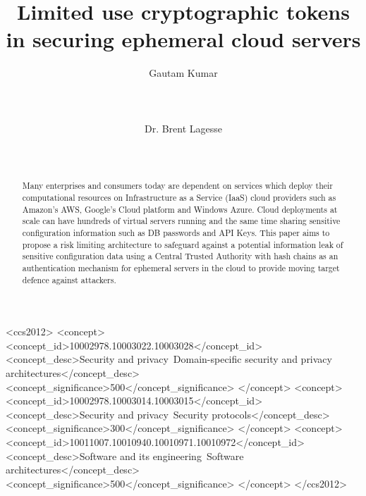 \documentclass{sig-alternate-05-2015}
\begin{document}
\title{Limited use cryptographic tokens in securing ephemeral cloud servers}

\author{
%
%
\alignauthor
Gautam Kumar\\
       \\
       \\
       \\
\alignauthor
Dr. Brent Lagesse\\
       \\
       \\
}



\maketitle


\begin{abstract}


Many enterprises and consumers today are dependent on services which deploy their computational resources on Infrastructure as a Service (IaaS) cloud providers such as Amazon's AWS, Google's Cloud platform and Windows Azure. Cloud deployments at scale can have hundreds of virtual servers running and the same time sharing sensitive configuration information such as DB passwords and API Keys. This paper aims to propose a risk limiting architecture to safeguard against a potential information leak of sensitive configuration data using a Central Trusted Authority with hash chains as an authentication mechanism for ephemeral servers in the cloud to provide moving target defence against attackers.
\end{abstract}


\begin{CCSXML}
<ccs2012>
<concept>
<concept_id>10002978.10003022.10003028</concept_id>
<concept_desc>Security and privacy~Domain-specific security and privacy architectures</concept_desc>
<concept_significance>500</concept_significance>
</concept>
<concept>
<concept_id>10002978.10003014.10003015</concept_id>
<concept_desc>Security and privacy~Security protocols</concept_desc>
<concept_significance>300</concept_significance>
</concept>
<concept>
<concept_id>10011007.10010940.10010971.10010972</concept_id>
<concept_desc>Software and its engineering~Software architectures</concept_desc>
<concept_significance>500</concept_significance>
</concept>
</ccs2012>
\end{CCSXML}
\end{document}
